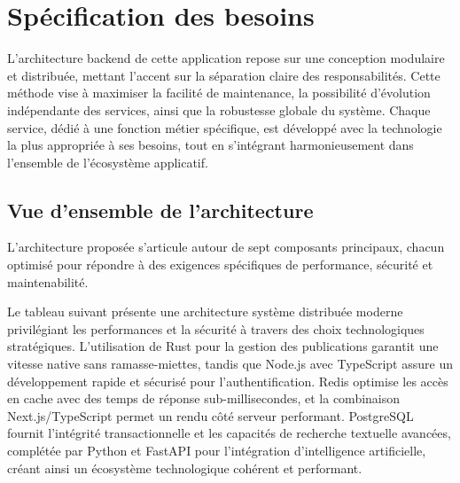 \documentclass[12pt]{rapportPfe}
\begin{document}
\chapter{Spécification des besoins}

L’architecture backend de cette application repose sur une conception modulaire et distribuée, mettant l’accent sur la séparation claire des responsabilités. Cette méthode vise à maximiser la facilité de maintenance, la possibilité d’évolution indépendante des services, ainsi que la robustesse globale du système. Chaque service, dédié à une fonction métier spécifique, est développé avec la technologie la plus appropriée à ses besoins, tout en s’intégrant harmonieusement dans l’ensemble de l’écosystème applicatif.

\section{Vue d'ensemble de l'architecture}
L'architecture proposée s'articule autour de sept composants principaux, chacun optimisé pour répondre à des exigences spécifiques de performance, sécurité et maintenabilité.

Le tableau suivant présente une architecture système distribuée moderne privilégiant les performances et la sécurité à travers des choix technologiques stratégiques. L'utilisation de Rust pour la gestion des publications garantit une vitesse native sans ramasse-miettes, tandis que Node.js avec TypeScript assure un développement rapide et sécurisé pour l'authentification. Redis optimise les accès en cache avec des temps de réponse sub-millisecondes, et la combinaison Next.js/TypeScript permet un rendu côté serveur performant. PostgreSQL fournit l'intégrité transactionnelle et les capacités de recherche textuelle avancées, complétée par Python et FastAPI pour l'intégration d'intelligence artificielle, créant ainsi un écosystème technologique cohérent et performant.
\end{document}
